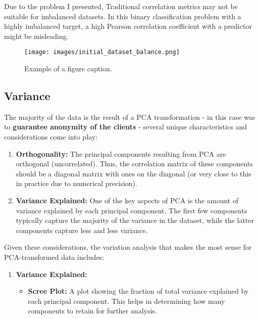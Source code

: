 Due to the problem I presented, Traditional correlation metrics may not be suitable for imbalanced datasets. In this binary classification problem with a highly imbalanced target, a high Pearson correlation coefficient with a predictor might be misleading.

\begin{figure}[htbp]
    \centerline{\texttt{[image: images/initial\_dataset\_balance.png]}}
    \caption{Example of a figure caption.}
    \label{initial_dataset_balance}
\end{figure}


\subsection{Variance}


The majority of the data is the result of a PCA transformation - in this case was to \textbf{guarantee anonymity of the clients} - several unique characteristics and considerations come into play:

\begin{enumerate}
    \item \textbf{Orthogonality:} The principal components resulting from PCA are orthogonal (uncorrelated). Thus, the correlation matrix of these components should be a diagonal matrix with ones on the diagonal (or very close to this in practice due to numerical precision).

    \item \textbf{Variance Explained:} One of the key aspects of PCA is the amount of variance explained by each principal component. The first few components typically capture the majority of the variance in the dataset, while the latter components capture less and less variance.
\end{enumerate}

Given these considerations, the variation analysis that makes the most sense for PCA-transformed data includes:

\begin{enumerate}
    \item \textbf{Variance Explained:}
          \begin{itemize}
              \item \textbf{Scree Plot:} A plot showing the fraction of total variance explained by each principal component. This helps in determining how many components to retain for further analysis.
          \end{itemize}
\end{enumerate}

